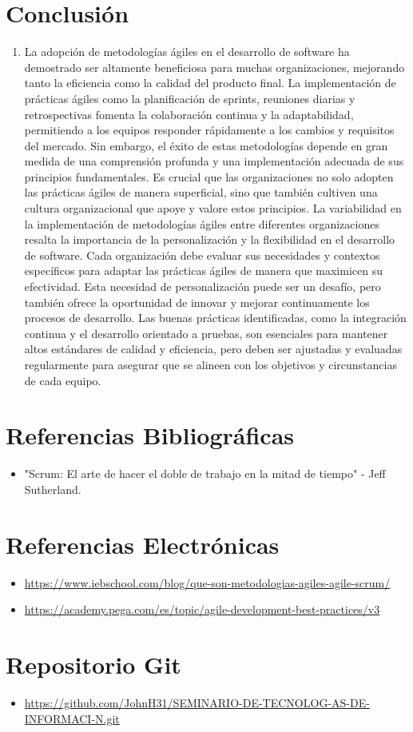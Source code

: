 \documentclass[12pt]{article}
\begin{document}
\section*{Conclusión}
\begin{enumerate}
    \item La adopción de metodologías ágiles en el desarrollo de software ha demostrado ser altamente beneficiosa para muchas organizaciones, mejorando tanto la eficiencia como la calidad del producto final. La implementación de prácticas ágiles como la planificación de sprints, reuniones diarias y retrospectivas fomenta la colaboración continua y la adaptabilidad, permitiendo a los equipos responder rápidamente a los cambios y requisitos del mercado. Sin embargo, el éxito de estas metodologías depende en gran medida de una comprensión profunda y una implementación adecuada de sus principios fundamentales. Es crucial que las organizaciones no solo adopten las prácticas ágiles de manera superficial, sino que también cultiven una cultura organizacional que apoye y valore estos principios. La variabilidad en la implementación de metodologías ágiles entre diferentes organizaciones resalta la importancia de la personalización y la flexibilidad en el desarrollo de software. Cada organización debe evaluar sus necesidades y contextos específicos para adaptar las prácticas ágiles de manera que maximicen su efectividad. Esta necesidad de personalización puede ser un desafío, pero también ofrece la oportunidad de innovar y mejorar continuamente los procesos de desarrollo. Las buenas prácticas identificadas, como la integración continua y el desarrollo orientado a pruebas, son esenciales para mantener altos estándares de calidad y eficiencia, pero deben ser ajustadas y evaluadas regularmente para asegurar que se alineen con los objetivos y circunstancias de cada equipo.

\end{enumerate}

\section*{Referencias Bibliográficas}
\begin{itemize}
    \item "Scrum: El arte de hacer el doble de trabajo en la mitad de tiempo" - Jeff Sutherland.
\end{itemize}

\section*{Referencias Electrónicas}
\begin{itemize}
    \item \url{https://www.iebschool.com/blog/que-son-metodologias-agiles-agile-scrum/}
    \item 
    \url{https://academy.pega.com/es/topic/agile-development-best-practices/v3}
\end{itemize}

\section*{Repositorio Git}
\begin{itemize}
    \item \url{https://github.com/JohnH31/SEMINARIO-DE-TECNOLOG-AS-DE-INFORMACI-N.git}
\end{itemize}
\end{document}
